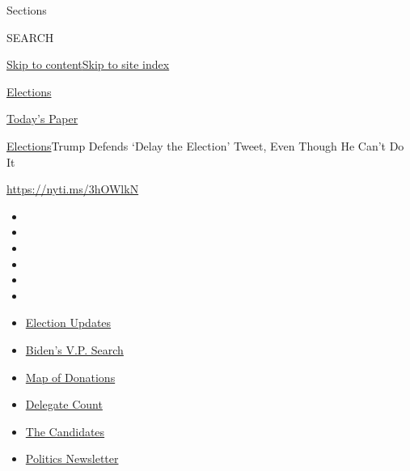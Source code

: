 Sections

SEARCH

\protect\hyperlink{site-content}{Skip to
content}\protect\hyperlink{site-index}{Skip to site index}

\href{https://www.nytimes3xbfgragh.onion/news-event/2020-election}{Elections}

\href{https://myaccount.nytimes3xbfgragh.onion/auth/login?response_type=cookie\&client_id=vi}{}

\href{https://www.nytimes3xbfgragh.onion/section/todayspaper}{Today's
Paper}

\href{/news-event/2020-election}{Elections}\textbar{}Trump Defends
`Delay the Election' Tweet, Even Though He Can't Do It

\href{https://nyti.ms/3hOWlkN}{https://nyti.ms/3hOWlkN}

\begin{itemize}
\item
\item
\item
\item
\item
\item
\end{itemize}

\begin{itemize}
\item
  \href{https://www.nytimes3xbfgragh.onion/2020/07/31/us/elections/biden-vs-trump.html?action=click\&pgtype=Article\&state=default\&region=TOP_BANNER\&context=storylines_menu}{Election
  Updates}
\item
  \href{https://www.nytimes3xbfgragh.onion/article/biden-vice-president-2020.html?action=click\&pgtype=Article\&state=default\&region=TOP_BANNER\&context=storylines_menu}{Biden's
  V.P. Search}
\item
  \href{https://www.nytimes3xbfgragh.onion/interactive/2020/07/24/us/politics/trump-biden-campaign-donors.html?action=click\&pgtype=Article\&state=default\&region=TOP_BANNER\&context=storylines_menu}{Map
  of Donations}
\item
  \href{https://www.nytimes3xbfgragh.onion/interactive/2020/us/elections/delegate-count-primary-results.html?action=click\&pgtype=Article\&state=default\&region=TOP_BANNER\&context=storylines_menu}{Delegate
  Count}
\item
  \href{https://www.nytimes3xbfgragh.onion/interactive/2019/us/politics/2020-presidential-candidates.html?action=click\&pgtype=Article\&state=default\&region=TOP_BANNER\&context=storylines_menu}{The
  Candidates}
\item
  \href{https://www.nytimes3xbfgragh.onion/newsletters/politics?action=click\&pgtype=Article\&state=default\&region=TOP_BANNER\&context=storylines_menu}{Politics
  Newsletter}
\end{itemize}

